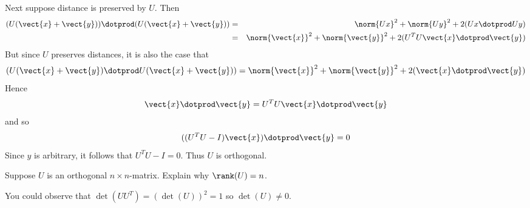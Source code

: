 \begin{enumialphparenastyle}
\begin{ex}
\begin{sol}
 Next suppose distance is
preserved by $U$. Then
\begin{eqnarray*}
(U(\vect{x}+\vect{y}))  \dotprod (U(\vect{x}+\vect{y}
)) &=&\norm{Ux} ^{2}+\norm{Uy}
^{2}+2 (Ux \dotprod Uy) \\
&=&\norm{\vect{x}} ^{2}+\norm{\vect{y}}
^{2}+2(U^{T}U\vect{x} \dotprod \vect{y})
\end{eqnarray*}
But since $U$ preserves distances, it is also the case that
\[
(U(\vect{x}+\vect{y}) \dotprod U(\vect{x}+\vect{y}
)) =\norm{\vect{x}} ^{2}+\norm{\vect{y}
} ^{2}+2(\vect{x}\dotprod \vect{y})
\]
Hence
\[
 \vect{x} \dotprod \vect{y} = U^{T}U\vect{x} \dotprod \vect{y}
\]
and so
\[
((U^{T}U-I) \vect{x}) \dotprod \vect{y} =0
\]
Since $y$ is arbitrary, it follows that $U^{T}U-I=0$. Thus $U$ is orthogonal.
\end{sol}
\end{ex}

\begin{ex} Suppose $U$ is an orthogonal $n\times n$-matrix. Explain why $\rank(U) =n$.
\begin{sol}
You could observe that $\det (UU^{T})
=(\det (U)) ^{2}=1$ so $\det (U) \neq 0.
$
\end{sol}
\end{ex}


\end{enumialphparenastyle}
